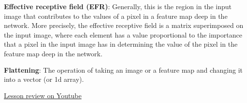 \textbf{Effective receptive field (EFR)}: Generally, this is the region in the input image that contributes to the values of a pixel in a feature map deep in the network. More precisely, the effective receptive field is a matrix superimposed on the input image, where each element has a value proportional to the importance that a pixel in the input image has in determining the value of the pixel in the feature map deep in the network. \newline

\textbf{Flattening}: The operation of taking an image or a feature map and changing it into a vector (or 1d array). \newline

\href{https://www.youtube.com/watch?v=Te9QCvhx6N8&t=53s&ab_channel=Udacity}{Lesson review on Youtube}